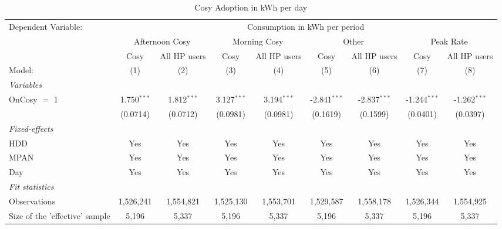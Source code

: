 
\begin{table}[htbp]
   \caption{\label{tab:non-smart-tariff} Cosy Adoption in kWh per day}
   \centering
   \begin{tabular}{lcccccccc}
      \tabularnewline \midrule \midrule
      Dependent Variable: & \multicolumn{8}{c}{Consumption in kWh per period}\\
       & \multicolumn{2}{c}{Afternoon Cosy} & \multicolumn{2}{c}{Morning Cosy} & \multicolumn{2}{c}{Other} & \multicolumn{2}{c}{Peak Rate} \\ 
                                     & Cosy          & All HP users  & Cosy          & All HP users  & Cosy           & All HP users   & Cosy           & All HP users \\   
      Model:                         & (1)           & (2)           & (3)           & (4)           & (5)            & (6)            & (7)            & (8)\\  
      \midrule
      \emph{Variables}\\
      OnCosy $=$ 1                   & 1.750$^{***}$ & 1.812$^{***}$ & 3.127$^{***}$ & 3.194$^{***}$ & -2.841$^{***}$ & -2.837$^{***}$ & -1.244$^{***}$ & -1.262$^{***}$\\   
                                     & (0.0714)      & (0.0712)      & (0.0981)      & (0.0981)      & (0.1619)       & (0.1599)       & (0.0401)       & (0.0397)\\   
      \midrule
      \emph{Fixed-effects}\\
      HDD                            & Yes           & Yes           & Yes           & Yes           & Yes            & Yes            & Yes            & Yes\\  
      MPAN                           & Yes           & Yes           & Yes           & Yes           & Yes            & Yes            & Yes            & Yes\\  
      Day                            & Yes           & Yes           & Yes           & Yes           & Yes            & Yes            & Yes            & Yes\\  
      \midrule
      \emph{Fit statistics}\\
      Observations                   & 1,526,241     & 1,554,821     & 1,525,130     & 1,553,701     & 1,529,587      & 1,558,178      & 1,526,344      & 1,554,925\\  
      Size of the 'effective' sample & 5,196         & 5,337         & 5,196         & 5,337         & 5,196          & 5,337          & 5,196          & 5,337\\  

\end{tabular}
\end{table}
